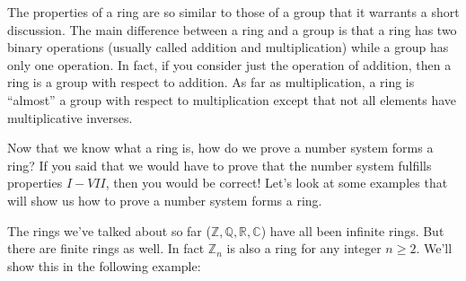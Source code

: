The properties of a ring are so similar to those of a group that it warrants a short discussion. The main difference between a ring and a group is that a ring has two binary operations (usually called addition and multiplication) while a group has only one operation.  In fact, if you consider just the operation of addition, then a ring is a group with respect to addition. As far as multiplication, a ring is ``almost'' a group with respect to multiplication except that not all elements have multiplicative inverses.

Now that we know what a ring is, how do we prove a number system forms a ring? If you said that we would have to prove that the number system fulfills properties $I-VII$, then you would be correct!  Let's look at some examples that will show us how to prove a number system forms a ring.

The rings we've talked about so far (${\mathbb Z},{\mathbb Q},{\mathbb R},{\mathbb C}$) have all been infinite rings. But there are finite rings as well.  In fact ${\mathbb Z}_n$ is also a ring for any integer $n \ge 2$. We'll show this in the following example:

